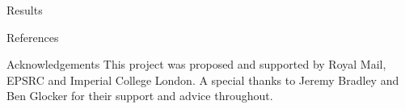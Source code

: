 \documentclass{beamer}
\begin{document}
\begin{frame}{Results}

\end{frame}




\begin{frame}{References}



\end{frame}





\begin{frame}{Acknowledgements}
This project was proposed and supported by Royal Mail, EPSRC and Imperial College London. A special thanks to Jeremy Bradley and Ben Glocker for their support and advice throughout.
\end{frame}

\end{document}
